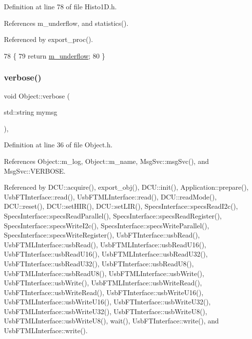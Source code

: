 Definition at line 78 of file Histo1\+D.\+h.



References m\+\_\+underflow, and statistics().



Referenced by export\+\_\+proc().


\begin{DoxyCode}
78                     \{
79     \textcolor{keywordflow}{return} \hyperlink{classHisto1D_a7f475b822f4bbb23209e2e523d228380}{m\_underflow};
80   \}  
\end{DoxyCode}
\mbox{\label{classObject_a83d2db2df682907ea1115ad721c1c4a1}} 
\subsubsection{\texorpdfstring{verbose()}{verbose()}\hspace{0.1cm}{\footnotesize\ttfamily [1/2]}}
{\footnotesize\ttfamily void Object\+::verbose (\begin{DoxyParamCaption}\item[{std\+::string}]{mymsg }\end{DoxyParamCaption})\hspace{0.3cm}{\ttfamily [inline]}, {\ttfamily [inherited]}}



Definition at line 36 of file Object.\+h.



References Object\+::m\+\_\+log, Object\+::m\+\_\+name, Msg\+Svc\+::msg\+Svc(), and Msg\+Svc\+::\+V\+E\+R\+B\+O\+SE.



Referenced by D\+C\+U\+::acquire(), export\+\_\+obj(), D\+C\+U\+::init(), Application\+::prepare(), Usb\+F\+T\+Interface\+::read(), Usb\+F\+T\+M\+L\+Interface\+::read(), D\+C\+U\+::read\+Mode(), D\+C\+U\+::reset(), D\+C\+U\+::set\+H\+I\+R(), D\+C\+U\+::set\+L\+I\+R(), Specs\+Interface\+::specs\+Read\+I2c(), Specs\+Interface\+::specs\+Read\+Parallel(), Specs\+Interface\+::specs\+Read\+Register(), Specs\+Interface\+::specs\+Write\+I2c(), Specs\+Interface\+::specs\+Write\+Parallel(), Specs\+Interface\+::specs\+Write\+Register(), Usb\+F\+T\+Interface\+::usb\+Read(), Usb\+F\+T\+M\+L\+Interface\+::usb\+Read(), Usb\+F\+T\+M\+L\+Interface\+::usb\+Read\+U16(), Usb\+F\+T\+Interface\+::usb\+Read\+U16(), Usb\+F\+T\+M\+L\+Interface\+::usb\+Read\+U32(), Usb\+F\+T\+Interface\+::usb\+Read\+U32(), Usb\+F\+T\+Interface\+::usb\+Read\+U8(), Usb\+F\+T\+M\+L\+Interface\+::usb\+Read\+U8(), Usb\+F\+T\+M\+L\+Interface\+::usb\+Write(), Usb\+F\+T\+Interface\+::usb\+Write(), Usb\+F\+T\+M\+L\+Interface\+::usb\+Write\+Read(), Usb\+F\+T\+Interface\+::usb\+Write\+Read(), Usb\+F\+T\+Interface\+::usb\+Write\+U16(), Usb\+F\+T\+M\+L\+Interface\+::usb\+Write\+U16(), Usb\+F\+T\+Interface\+::usb\+Write\+U32(), Usb\+F\+T\+M\+L\+Interface\+::usb\+Write\+U32(), Usb\+F\+T\+Interface\+::usb\+Write\+U8(), Usb\+F\+T\+M\+L\+Interface\+::usb\+Write\+U8(), wait(), Usb\+F\+T\+Interface\+::write(), and Usb\+F\+T\+M\+L\+Interface\+::write().


